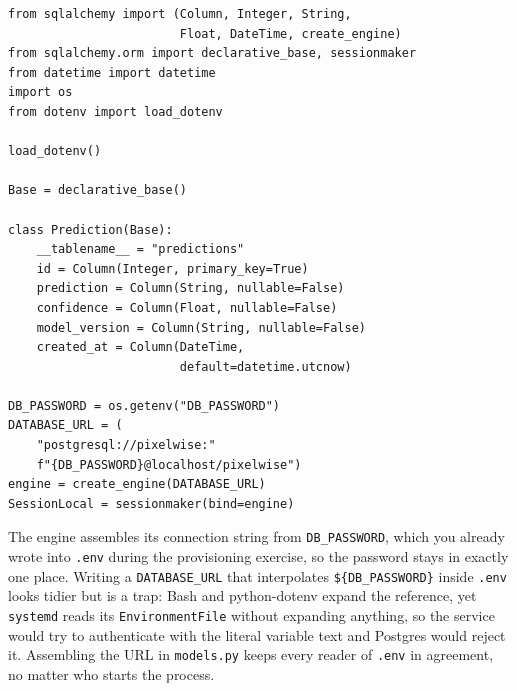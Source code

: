 \begin{verbatim}
from sqlalchemy import (Column, Integer, String,
                        Float, DateTime, create_engine)
from sqlalchemy.orm import declarative_base, sessionmaker
from datetime import datetime
import os
from dotenv import load_dotenv

load_dotenv()

Base = declarative_base()

class Prediction(Base):
    __tablename__ = "predictions"
    id = Column(Integer, primary_key=True)
    prediction = Column(String, nullable=False)
    confidence = Column(Float, nullable=False)
    model_version = Column(String, nullable=False)
    created_at = Column(DateTime,
                        default=datetime.utcnow)

DB_PASSWORD = os.getenv("DB_PASSWORD")
DATABASE_URL = (
    "postgresql://pixelwise:"
    f"{DB_PASSWORD}@localhost/pixelwise")
engine = create_engine(DATABASE_URL)
SessionLocal = sessionmaker(bind=engine)
\end{verbatim}





The engine assembles its connection string from \texttt{DB\_PASSWORD},
which you already wrote into \texttt{.env} during the provisioning
exercise, so the password stays in exactly one place. Writing a
\texttt{DATABASE\_URL} that interpolates \texttt{\$\{DB\_PASSWORD\}}
inside \texttt{.env} looks tidier but is a trap: Bash and python-dotenv
expand the reference, yet \texttt{systemd} reads its
\texttt{EnvironmentFile} without expanding anything, so the service would
try to authenticate with the literal variable text and Postgres would
reject it. Assembling the URL in \texttt{models.py} keeps every reader of
\texttt{.env} in agreement, no matter who starts the process.

